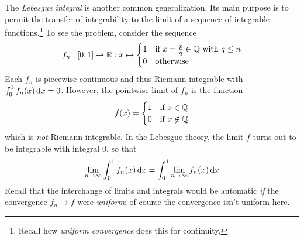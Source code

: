 The \emph{Lebesgue integral} is another common generalization. Its main purpose is to permit the transfer of integrability to the limit of a sequence of integrable functions.\footnote{Recall how \emph{uniform convergence} does this for continuity.} To see the problem, consider the sequence
\[f_n:[0,1]\to\mathbb{R}:x\mapsto\begin{cases}
1&\text{if }x=\frac pq\in\mathbb{Q}\text{ with }q\le n\\
0&\text{otherwise}
\end{cases}\]
Each $f_n$ is piecewise continuous and thus Riemann integrable with $\int_0^1f_n(x)\,{\mathrm{d} x}=0$. However, the pointwise limit of $f_n$ is the function
\[f(x)=\begin{cases}
1&\text{if }x\in\mathbb{Q}\\
0&\text{if }x\not\in\mathbb{Q}
\end{cases}\]
which is \emph{not} Riemann integrable. In the Lebesgue theory, the limit $f$ turns out to be integrable with integral 0, so that
\[\lim_{n\to\infty}\int_0^1f_n(x)\,{\mathrm{d} x}=\int_0^1\lim_{n\to\infty}f_n(x)\,{\mathrm{d} x}\]
Recall that the interchange of limits and integrals would be automatic \emph{if} the convergence $f_n\to f$ were \emph{uniform}: of course the convergence isn't uniform here. 